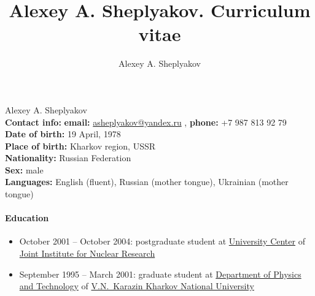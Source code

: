 \documentclass{report}
\author{Alexey A. Sheplyakov}
\title{Alexey A. Sheplyakov. Curriculum vitae}
\begin{document}
\pagestyle{empty}
 Alexey A. Sheplyakov \\
{\bf Contact info:} 
  {\bf email:} \href{mailto:asheplyakov@yandex.ru}{asheplyakov@yandex.ru} %
, {\bf phone:} +7 987 813 92 79 \\
{\bf Date of birth:} 19 April, 1978 \\
{\bf Place of birth:} Kharkov region, USSR \\
{\bf Nationality:} Russian Federation \\
{\bf Sex:} male \\
{\bf Languages:} English (fluent), Russian (mother tongue), Ukrainian (mother tongue)

\paragraph{Education}
\begin{itemize}
\item
October 2001 -- October 2004: postgraduate student at
\href{http://newuc.jinr.ru}{University Center} of
\href{http://www.jinr.ru}{Joint Institute for Nuclear Research}
\item
September 1995 -- March 2001: graduate student at
\href{http://www-htuni.univer.kharkov.ua/ftf/index.htm}{Department of Physics and Technology}
of
\href{http://www.univer.kharkov.ua/en}{V.N.~Karazin Kharkov National University}
\end{itemize}
\end{document}

